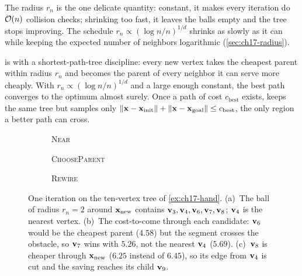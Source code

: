 The radius $r_n$ is the one delicate quantity: constant, it makes every
iteration do $\mathcal{O}\!\left(n\right)$ collision checks; shrinking too fast, it leaves the
balls empty and the tree stops improving. The schedule
$r_n\propto(\log n/n)^{1/d}$ shrinks as slowly as it can while keeping the
expected number of neighbors logarithmic (\cref{sec:ch17-radius}).

\begin{keyidea}
\rrtstar is \rrt with a shortest-path-tree discipline: every new vertex takes
the cheapest parent within radius $r_n$ and becomes the parent of every
neighbor it can serve more cheaply. With $r_n\propto(\log n/n)^{1/d}$ and a
large enough constant, the best path converges to the optimum almost surely.
Once a path of cost $c_{\mathrm{best}}$ exists, \irrtstar keeps the same tree
but samples only $\left\lVert \mathbf{x}-\mathbf{x}_{\mathrm{init}} \right\rVert+\left\lVert \mathbf{x}-\mathbf{x}_{\mathrm{goal}} \right\rVert\le c_{\mathrm{best}}$, the only region a better path can cross.
\end{keyidea}

\begin{figure}[tb]
  \centering
  \begin{subfigure}[b]{0.333\textwidth}\centering
    \caption{\textsc{Near}}
  \end{subfigure}\hfill
  \begin{subfigure}[b]{0.333\textwidth}\centering
    \caption{\textsc{ChooseParent}}
  \end{subfigure}\hfill
  \begin{subfigure}[b]{0.333\textwidth}\centering
    \caption{\textsc{Rewire}}
  \end{subfigure}
  \caption{One \rrtstar iteration on the ten-vertex tree of
  \cref{ex:ch17-hand}. (a)~The ball of radius $r_n=2$ around
  $\mathbf{x}_{\mathrm{new}}$ contains $\mathbf{v}_3,\mathbf{v}_4,\mathbf{v}_6,\mathbf{v}_7,\mathbf{v}_8$; $\mathbf{v}_4$ is the nearest
  vertex. (b)~The cost-to-come through each candidate: $\mathbf{v}_6$ would be the
  cheapest parent ($4.58$) but the segment crosses the obstacle, so $\mathbf{v}_7$
  wins with $5.26$, not the nearest $\mathbf{v}_4$ ($5.69$). (c)~$\mathbf{v}_8$ is cheaper
  through $\mathbf{x}_{\mathrm{new}}$ ($6.25$ instead of $6.45$), so its edge from
  $\mathbf{v}_4$ is cut and the saving reaches its child $\mathbf{v}_9$.}
  \label{fig:ch17-primitives}
\end{figure}

